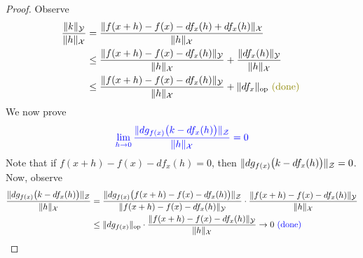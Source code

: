 \documentclass{report}
\begin{document}
\begin{proof}
Observe 
\begin{align*}
\frac{\norm{k}_\mathcal{Y}}{\norm{h}_\mathcal{X}}&= \frac{\norm{f(x+h)-f(x)-df_x(h)+df_x(h)}_\mathcal{X}}{\norm{h}_\mathcal{X}}\\
&\leq \frac{\norm{f(x+h)-f(x)-df_x(h)}_\mathcal{Y}}{\norm{h}_\mathcal{X}}+\frac{\norm{df_x(h)}_\mathcal{Y}}{\norm{h}_\mathcal{X}}\\
&\leq \frac{\norm{f(x+h)-f(x)-df_x(h)}_\mathcal{Y}}{\norm{h}_\mathcal{X}} + \norm{df_x}_\text{op} \odone
\end{align*}
We now prove 
\begin{align*}
\textcolor{blue}{\lim_{h\to 0} \frac{\| dg_{f(x)}\big(k-df_x(h) \big) \|_\mathcal{Z}}{\| h \|_\mathcal{X}}=0}
\end{align*}
Note that if $f(x+h)-f(x)-df_x(h)=0$, then $\| dg_{f(x)}\big(k-df_x(h) \big) \|_\mathcal{Z}=0$. Now, observe 
\begin{align*}
\frac{\| dg_{f(x)}\big(k-df_x(h) \big) \|_\mathcal{Z}}{\| h \|_\mathcal{X}}&= \frac{\| dg_{f(x)}\big(f(x+h)-f(x)-df_x(h) \big) \|_\mathcal{Z}}{\| f(x+h)-f(x)-df_x(h) \|_\mathcal{Y}}\cdot \frac{\| f(x+h)-f(x)-df_x(h) \|_\mathcal{Y}}{\| h \|_\mathcal{X}}\\
&\leq \| dg_{f(x)} \|_\text{op}\cdot \frac{\| f(x+h)-f(x)-df_x(h) \|_\mathcal{Y}}{\| h \|_\mathcal{X}}\to 0 \textcolor{blue}{\text{ (done) }}
\end{align*}
\end{proof}
\end{document}
